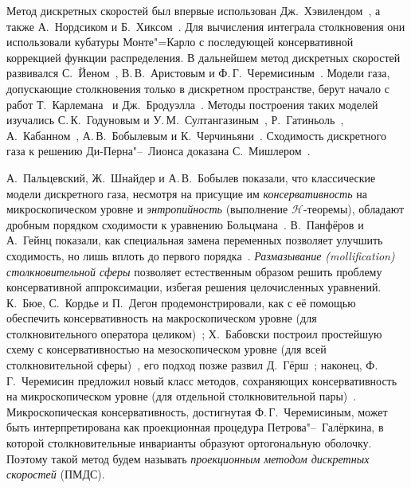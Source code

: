 Метод дискретных скоростей был впервые использован Дж.~Хэвилендом~\autocite{Haviland1965},
а также А.~Нордсиком и Б.~Хиксом~\autocite{Nordsieck1966}.
Для вычисления интеграла столкновения они использовали кубатуры Монте"=Карло
с последующей консервативной коррекцией функции распределения.
В дальнейшем метод дискретных скоростей развивался С.~Йеном~\autocite{Yen1984},
В.\,В.~Аристовым и Ф.\,Г.~Черемисиным~\autocite{Tcheremissine1980}.
Модели газа, допускающие столкновения только в дискретном пространстве, берут начало с работ
Т.~Карлемана~\autocite{Carleman1957} и Дж.~Бродуэлла~\autocite{Broadwell1964shock, Broadwell1964shear}.
Методы построения таких моделей изучались С.\,К.~Годуновым и У.\,М.~Султангазиным~\autocite{Sultangazin1971},
Р.~Гатиньоль~\autocite{Gatignol1975}, А.~Кабанном~\autocite{Cabannes1980},
А.\,В.~Бобылевым и К.~Черчиньяни~\autocite{Bobylev1999dvm}.
Сходимость дискретного газа к решению Ди-Перна"--~Лионса доказана С.~Мишлером~\autocite{Mischler1997}.

А.~Пальцевский, Ж.~Шнайдер и А.\,В.~Бобылев показали, что классические модели дискретного газа,
несмотря на присущие им \emph{консервативность} на микроскопическом уровне и \emph{энтропийность}
(выполнение \(\mathcal{H}\)-теоремы), обладают дробным порядком сходимости к уравнению Больцмана~\autocite{Palczewski1997}.
В.~Панфёров и А.~Гейнц показали, как специальная замена переменных
позволяет улучшить сходимость, но лишь вплоть до первого порядка~\autocite{Panferov2002}.
\emph{Размазывание (mollification) столкновительной сферы} позволяет естественным образом
решить проблему консервативной аппроксимации, избегая решения целочисленных уравнений.
К.~Бюе, С.~Кордье и П.~Дегон продемонстрировали, как с её помощью обеспечить консервативность
на макроскопическом уровне (для столкновительного оператора целиком)~\autocite{Buet1998};
Х.~Бабовски построил простейшую схему с консервативностью на мезоскопическом уровне
(для всей столкновительной сферы)~\autocite{Babovsky1998}, его подход позже развил Д.~Гёрш~\autocite{Goersch2002};
наконец, Ф.\,Г.~Черемисин предложил новый класс методов, сохраняющих консервативность
на микроскопическом уровне (для отдельной столкновительной пары)~\autocite{Tcheremissine1997}.
Микроскопическая консервативность, достигнутая Ф.\,Г.~Черемисиным, может быть интерпретирована
как проекционная процедура Петрова"--~Галёркина,
в которой столкновительные инварианты образуют ортогональную оболочку.
Поэтому такой метод будем называть \emph{проекционным методом дискретных скоростей} (ПМДС).

